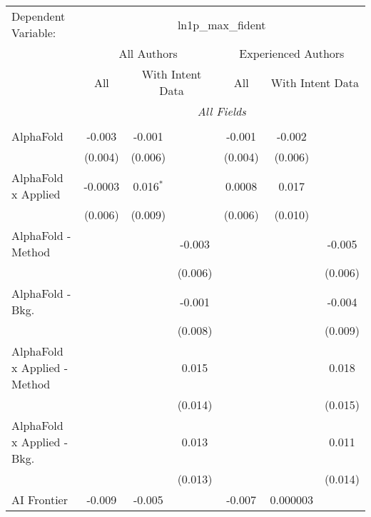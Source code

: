 \begingroup
\centering
\begin{tabular}{lcccccc}
   \tabularnewline \midrule \midrule
   Dependent Variable: & \multicolumn{6}{c}{ln1p\_max\_fident}\\
 & \multicolumn{3}{c}{All Authors} & \multicolumn{3}{c}{Experienced Authors} \\
\cmidrule(lr){2-4} \cmidrule(lr){5-7}
 & \multicolumn{1}{c}{All} & \multicolumn{2}{c}{With Intent Data} & \multicolumn{1}{c}{All} & \multicolumn{2}{c}{With Intent Data} \\
\cmidrule(lr){2-2} \cmidrule(lr){3-4} \cmidrule(lr){5-5} \cmidrule(lr){6-7}
 & \multicolumn{6}{c}{\textit{All Fields}} \\ \\
   AlphaFold                      & -0.003  & -0.001      &                & -0.001  & -0.002   &   \\   
                                  & (0.004) & (0.006)     &                & (0.004) & (0.006)  &   \\   
   AlphaFold x Applied            & -0.0003 & 0.016$^{*}$ &                & 0.0008  & 0.017    &   \\   
                                  & (0.006) & (0.009)     &                & (0.006) & (0.010)  &   \\   
   AlphaFold - Method             &         &             & -0.003         &         &          & -0.005\\   
                                  &         &             & (0.006)        &         &          & (0.006)\\   
   AlphaFold - Bkg.               &         &             & -0.001         &         &          & -0.004\\   
                                  &         &             & (0.008)        &         &          & (0.009)\\   
   AlphaFold x Applied - Method   &         &             & 0.015          &         &          & 0.018\\   
                                  &         &             & (0.014)        &         &          & (0.015)\\   
   AlphaFold x Applied - Bkg.     &         &             & 0.013          &         &          & 0.011\\   
                                  &         &             & (0.013)        &         &          & (0.014)\\   
   AI Frontier                    & -0.009  & -0.005      &                & -0.007  & 0.000003 &   \\   

\end{tabular}
